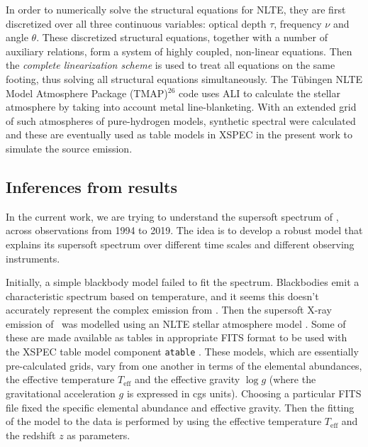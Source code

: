 		In order to numerically solve the structural equations for NLTE, they are first discretized over all three continuous variables: optical depth $\tau$, frequency $\nu$ and angle $\theta$. These discretized structural equations, together with a number of auxiliary relations, form a system of highly coupled, non-linear equations. Then the \textit{complete linearization scheme} \cite{auer1970non} is used to treat all equations on the same footing, thus solving all structural equations simultaneously. The T\"{u}bingen NLTE Model Atmosphere Package (TMAP)$^{26}$ code uses ALI to calculate the stellar atmosphere by taking into account metal line-blanketing. With an extended grid of such atmospheres of pure-hydrogen models, synthetic spectral were calculated and these are eventually used as table models in XSPEC in the present work to simulate the source emission.
    
    \subsection{Inferences from results}
    In the current work, we are trying to understand the supersoft spectrum of \source, across observations from 1994 to 2019. The idea is to develop a robust model that explains its supersoft spectrum over different time scales and different observing instruments. %
    	
    Initially, a simple blackbody model failed to fit the spectrum. Blackbodies emit a characteristic spectrum based on temperature, and it seems this doesn't accurately represent the complex emission from \source. Then the supersoft X-ray emission of \source\ was modelled using an NLTE stellar atmosphere model \cite{werner1999classical}. Some of these are made available as tables in appropriate FITS format to be used with the XSPEC table model component \texttt{atable} \cite{rauch2003grid,rauch2010nlte}. These models, which are essentially pre-calculated grids, vary from one another in terms of the elemental abundances, the effective temperature $T_\text{eff}$ and the effective gravity $\log{g}$ (where the gravitational acceleration $g$ is expressed in cgs units). Choosing a particular FITS file fixed the specific elemental abundance and effective gravity. Then the fitting of the model to the data is performed by using the effective temperature $T_\text{eff}$ and the redshift $z$ as parameters.
    
